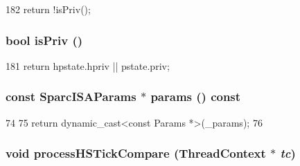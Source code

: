 \begin{DoxyCode}
182 { return !isPriv(); }
\end{DoxyCode}
\hypertarget{classSparcISA_1_1ISA_a9ce1572daa5a507ad7a319d5de9e6fe3}{
\subsubsection[{isPriv}]{\setlength{\rightskip}{0pt plus 5cm}bool isPriv ()}}
\label{classSparcISA_1_1ISA_a9ce1572daa5a507ad7a319d5de9e6fe3}



\begin{DoxyCode}
181 { return hpstate.hpriv || pstate.priv; }
\end{DoxyCode}
\hypertarget{classSparcISA_1_1ISA_a920ae59e79267fe19ed92248b3807e8d}{
\subsubsection[{params}]{\setlength{\rightskip}{0pt plus 5cm}const SparcISAParams $\ast$ params () const}}
\label{classSparcISA_1_1ISA_a920ae59e79267fe19ed92248b3807e8d}



\begin{DoxyCode}
74 {
75     return dynamic_cast<const Params *>(_params);
76 }
\end{DoxyCode}
\hypertarget{classSparcISA_1_1ISA_a3ad754d09a0ae2ad17746198b0d3563d}{
\subsubsection[{processHSTickCompare}]{\setlength{\rightskip}{0pt plus 5cm}void processHSTickCompare ({\bf ThreadContext} $\ast$ {\em tc})}}
\label{classSparcISA_1_1ISA_a3ad754d09a0ae2ad17746198b0d3563d}




